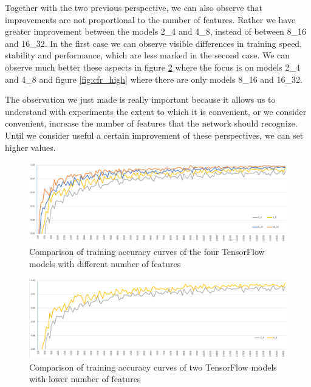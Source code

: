 Together with the two previous perspective, we can also observe that improvements are not proportional to the number of features. Rather we have greater improvement between the models 2\_4 and 4\_8, instead of between 8\_16 and 16\_32. In the first case we can observe visible differences in training speed, stability and performance, which are less marked in the second case. We can observe much better these aspects in figure \ref{fig:cfr_low} where the focus is on models 2\_4 and 4\_8 and figure \ref{fig:cfr_high} where there are only models 8\_16 and 16\_32.

The observation we just made is really important because it allows us to understand with experiments the extent to which it is convenient, or we consider convenient, increase the number of features that the network should recognize. Until we consider useful a certain improvement of these perspectives, we can set higher values. 

\begin{landscape}
	\begin{figure}
		\centering
		\includegraphics[width=1\textheight]{Images/cfr_all}
		\caption{Comparison of training accuracy curves of the four TensorFlow models with different number of features}
		\label{fig:cfr_all}
	\end{figure}
\end{landscape}

\begin{landscape}
\begin{figure}
	\centering
	\includegraphics[width=1\textheight]{Images/cfr_2_4_vs_4_8}
	\caption{Comparison of training accuracy curves of two TensorFlow models with lower number of features}
	\label{fig:cfr_low}
\end{figure}
\end{landscape}


